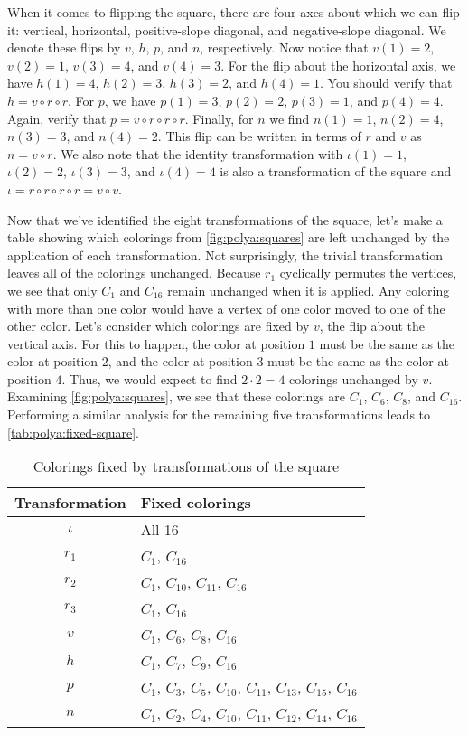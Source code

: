When it comes to flipping the square, there are four axes about which
we can flip it: vertical, horizontal, positive-slope diagonal, and
negative-slope diagonal. We denote these flips by $v$, $h$, $p$, and
$n$, respectively. Now notice that $v(1) = 2$, $v(2) = 1$, $v(3) = 4$,
and $v(4) = 3$. For the flip about the horizontal axis, we have $h(1)
= 4$, $h(2) = 3$, $h(3)=2$, and $h(4)= 1$. You should verify that $h =
v\circ r\circ r$. For $p$, we have $p(1) = 3$, $p(2) = 2$, $p(3)=1$,
and $p(4)=4$. Again, verify that $p = v\circ r\circ r\circ
r$. Finally, for $n$ we find $n(1) = 1$, $n(2) = 4$, $n(3) = 3$, and
$n(4)=2$. This flip can be written in terms of $r$ and $v$ as
$n=v\circ r$. We also note that the identity transformation with
$\iota(1)=1$, $\iota(2)=2$, $\iota(3)=3$, and $\iota(4)=4$ is also a
transformation of the square and $\iota = r\circ r\circ r\circ
r=v\circ v$. 

Now that we've identified the eight transformations of the square,
let's make a table showing which colorings from
\autoref{fig:polya:squares} are left unchanged by the application of
each transformation. Not surprisingly, the trivial transformation
leaves all of the colorings unchanged. Because $r_1$ cyclically
permutes the vertices, we see that only $C_1$ and $C_{16}$ remain
unchanged when it is applied. Any coloring with more than one color
would have a vertex of one color moved to one of the other
color. Let's consider which colorings are fixed by $v$, the flip about
the vertical axis. For this to happen, the color at position $1$ must
be the same as the color at position $2$, and the color at position
$3$ must be the same as the color at position $4$. Thus, we would
expect to find $2\cdot 2 = 4$ colorings unchanged by $v$. Examining
\autoref{fig:polya:squares}, we see that these colorings are $C_1$,
$C_6$, $C_8$, and $C_{16}$. Performing a similar analysis for the
remaining five transformations leads to
\autoref{tab:polya:fixed-square}.

\begin{table}
  \centering
  \begin{tabular}{c|l}
    Transformation & Fixed colorings\\\hline
    $\iota$ & All 16\\
    $r_1$ & $C_1$, $C_{16}$\\
    $r_2$ & $C_{1}$, $C_{10}$, $C_{11}$, $C_{16}$\\
    $r_3$ & $C_1$, $C_{16}$\\
    $v$ & $C_1$, $C_6$, $C_8$, $C_{16}$\\
    $h$ & $C_1$, $C_7$, $C_{9}$, $C_{16}$\\
    $p$ & $C_1$, $C_3$, $C_5$, $C_{10}$, $C_{11}$, $C_{13}$, $C_{15}$,
    $C_{16}$\\
    $n$ & $C_1$, $C_2$, $C_4$, $C_{10}$, $C_{11}$, $C_{12}$, $C_{14}$,
    $C_{16}$\\
  \end{tabular}
  \caption{Colorings fixed by transformations of the square}
  \label{tab:polya:fixed-square}
\end{table}

